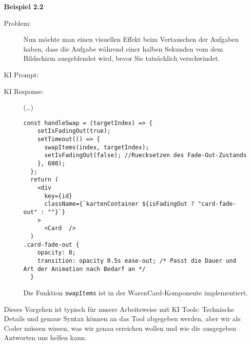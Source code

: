 \textbf{Beispiel 2.2} 
\begin{description}
    \item[Problem:] 
Nun möchte man einen visuellen Effekt beim Vertauschen der Aufgaben haben, dass die Aufgabe während einer halben Sekunden vom dem Bildschirm ausgeblendet wird, bevor Sie tatsächlich verschwindet. 
\item[KI Prompt:] \emph{ }

\item[KI Response:] (\ldots)
\begin{lstlisting}
const handleSwap = (targetIndex) => {
    setIsFadingOut(true);
    setTimeout(() => {
      swapItems(index, targetIndex);
      setIsFadingOut(false); //Ruecksetzen des Fade-Out-Zustands
    }, 600);
  };
  return (
    <div
      key={id}
      className={`kartenContainer ${isFadingOut ? "card-fade-out" : ""}`}
    >
      <Card  />
  )
.card-fade-out {
    opacity: 0;
    transition: opacity 0.5s ease-out; /* Passt die Dauer und Art der Animation nach Bedarf an */
  }

\end{lstlisting}

Die Funktion \texttt{swapItems} ist in der WarenCard-Komponente implementiert.
\end{description}
Dieses Vorgehen ist typisch für unsere Arbeitsweise mit KI Tools: Technische Details und genaue Syntax können an das Tool abgegeben werden, aber wir als Coder müssen wissen, was wir genau erreichen wollen und wie die ausgegeben Antworten uns helfen kann. 